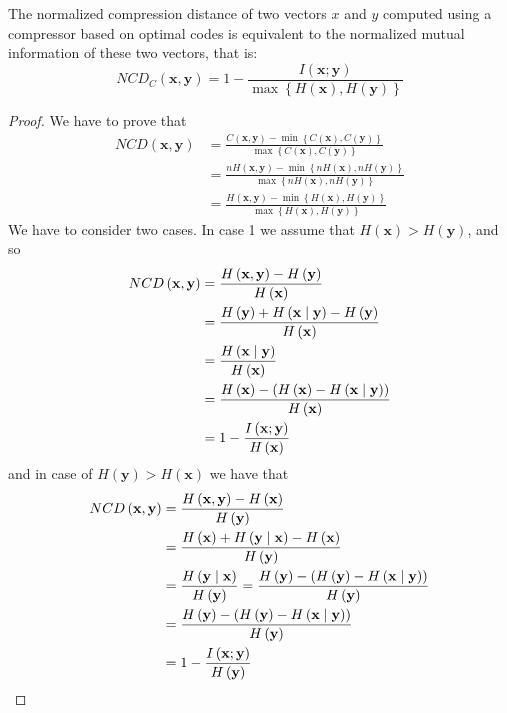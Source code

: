 \begin{proposition}
The normalized compression distance of two vectors $x$ and $y$ computed using a compressor based on optimal codes is equivalent to the normalized mutual information of these two vectors, that is:
\[
NCD_C\left(\mathbf{x},\mathbf{y}\right)=1-\frac{I\left(\mathbf{x};\mathbf{y}\right)}{\max\left\{ H\left(\mathbf{x}\right),H\left(\mathbf{y}\right)\right\} }
\]
\end{proposition}
\begin{proof}
We have to prove that
\begin{align*}
NCD\left(\mathbf{x},\mathbf{y}\right) & = \frac{C\left(\mathbf{x},\mathbf{y}\right)-\min\left\{ C\left(\mathbf{x}\right),C\left(\mathbf{y}\right)\right\} }{\max\left\{ C\left(\mathbf{x}\right),C\left(\mathbf{y}\right)\right\} } \\
& =\frac{nH\left(\mathbf{x},\mathbf{y}\right)-\min\left\{ nH\left(\mathbf{x}\right),nH\left(\mathbf{y}\right)\right\} }{\max\left\{ nH\left(\mathbf{x}\right),nH\left(\mathbf{y}\right)\right\} } \\
& =\frac{H\left(\mathbf{x},\mathbf{y}\right)-\min\left\{ H\left(\mathbf{x}\right),H\left(\mathbf{y}\right)\right\} }{\max\left\{ H\left(\mathbf{x}\right),H\left(\mathbf{y}\right)\right\} }
\end{align*}
We have to consider two cases. In case 1 we assume that $H\left(\mathbf{x}\right)>H\left(\mathbf{y}\right)$, and so
\begin{align*}
NCD\left(\mathbf{x},\mathbf{y}\right) & = \frac{H\left(\mathbf{x},\mathbf{y}\right)-H\left(\mathbf{y}\right)}{H\left(\mathbf{x}\right)} \\
& = \frac{H\left(\mathbf{y}\right)+H\left(\mathbf{x}\mid\mathbf{y}\right)-H\left(\mathbf{y}\right)}{H\left(\mathbf{x}\right)} \\ 
& = \frac{H\left(\mathbf{x}\mid\mathbf{y}\right)}{H\left(\mathbf{x}\right)} \\
& = \frac{H\left(\mathbf{x}\right)-\left(H\left(\mathbf{x}\right)-H\left(\mathbf{x}\mid\mathbf{y}\right)\right)}{H\left(\mathbf{x}\right)} \\ & = 1-\frac{I\left(\mathbf{x};\mathbf{y}\right)}{H\left(\text{\ensuremath{\mathbf{x}}}\right)}
\end{align*}
and in case of $H\left(\mathbf{y}\right)>H\left(\mathbf{x}\right)$ we have that
\begin{align*}
NCD\left(\mathbf{x},\mathbf{y}\right) & = \frac{H\left(\mathbf{x},\mathbf{y}\right)-H\left(\mathbf{x}\right)}{H\left(\mathbf{y}\right)} \\ & =\frac{H\left(\mathbf{x}\right)+H\left(\mathbf{y}\mid\mathbf{x}\right)-H\left(\mathbf{x}\right)}{H\left(\mathbf{y}\right)} \\ & = \frac{H\left(\mathbf{y}\mid\mathbf{x}\right)}{H\left(\mathbf{y}\right)}=\frac{H\left(\mathbf{y}\right)-\left(H\left(\mathbf{y}\right)-H\left(\mathbf{x}\mid\mathbf{y}\right)\right)}{H\left(\mathbf{y}\right)} \\ & = \frac{H\left(\mathbf{y}\right)-\left(H\left(\mathbf{y}\right)-H\left(\mathbf{x}\mid\mathbf{y}\right)\right)}{H\left(\mathbf{y}\right)} \\ & = 1-\frac{I\left(\mathbf{x};\mathbf{y}\right)}{H\left(\text{\ensuremath{\mathbf{y}}}\right)}

\end{align*}
\end{proof}
